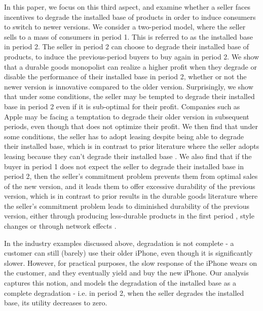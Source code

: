 \documentclass[isre,blindrev]{informs3} %
\begin{document}
In this paper, we focus on this third aspect, and examine whether a seller faces incentives to degrade the installed base of products in order to induce consumers to switch to newer versions. We consider a two-period model, where the seller sells to a mass of consumers in period 1. This is referred to as the installed base in period 2. The seller in period 2 can choose to degrade their installed base of products, to induce the previous-period buyers to buy again in period 2. We show that a durable goods monopolist can realize a higher profit when they degrade or disable the performance of their installed base in period 2, whether or not the newer version is innovative compared to the older version. Surprisingly, we show that under some conditions, the seller may be tempted to degrade their installed base in period 2 even if it is sub-optimal
for their profit. Companies such as Apple may be facing a temptation to degrade their older version in subsequent periods, even though that does not optimize their profit. We then find that under some conditions, the seller has to adopt leasing despite being able to degrade their installed base, which is in contrast to prior literature where the seller adopts leasing because they can't degrade their installed base \citep{stokey_rational_1981, bulow_durable-goods_1982, bhaskaran_selling_2005}.
We also find that if the buyer in period 1 does not expect the seller to degrade their installed base in period 2, then the seller's commitment problem prevents them from optimal sales of the new version, and it leads them to offer excessive durability of the previous version, which is in contrast to prior results in the durable goods literature where the seller's commitment problem leads to diminished durability of the previous version, either through producing less-durable products in the first period \citep{bulow_durable-goods_1982}, style changes \citep{waldman_new_1993} or through network effects \citep{ellison_neo-luddites_2000, sankaranarayanan2007innovation}. 

In the industry examples discussed above, degradation is not complete - a customer can still (barely) use their older iPhone, even though it is significantly
slower. However, for practical purposes, the slow response of the iPhone wears on the customer, and they eventually yield and buy the new iPhone.
Our analysis captures this notion, and models the degradation of the installed base as a complete degradation - i.e. in period 2, when the seller
degrades the installed base, its utility decreases to zero.
\end{document}
